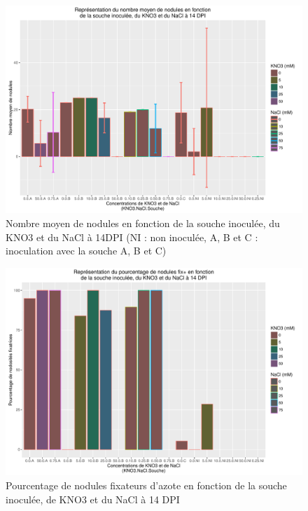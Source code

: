 \documentclass[12pt,a4paper,onecolumn]{article}
\begin{document}
		\begin{figure}[p]
			\begin{center}
				\includegraphics[width=0.9\linewidth]{nodmean14.pdf}
			\end{center}
			\caption{Nombre moyen de nodules en fonction de la souche inoculée, du KNO3 et du NaCl à 14DPI (NI : non inoculée, A, B et C : inoculation avec la souche  A, B et C)}
			\label{nodmean14}
		\end{figure}

		\begin{figure}[p]
			\begin{center}
				\includegraphics[width=0.9\linewidth]{rapfix+nod14.pdf}
			\end{center}
			\caption{Pourcentage de nodules fixateurs d’azote en fonction de la souche inoculée, de KNO3 et du NaCl à 14 DPI}
			\label{fix+-14}
		\end{figure}




\end{document}
